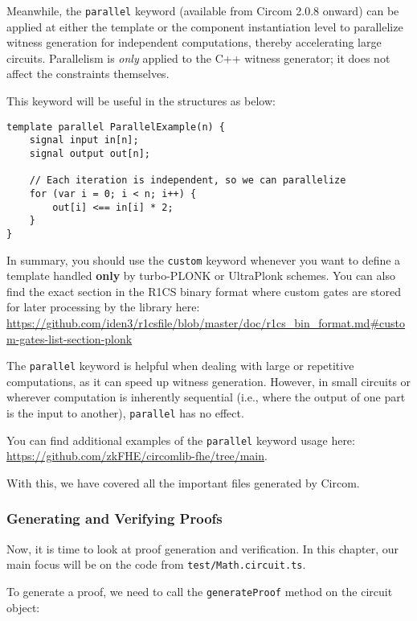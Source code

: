 \documentclass[../lecture-notes.tex]{subfiles}
\begin{document}
    Meanwhile, the \texttt{parallel} keyword (available from Circom 2.0.8 onward) can be applied at either the template or
    the component instantiation level to parallelize witness generation for independent computations, thereby accelerating large circuits.
    Parallelism is \emph{only} applied to the C++ witness generator; it does not affect the constraints themselves.

    This keyword will be useful in the structures as below:

    \begin{lstlisting}[language=Circom,basicstyle=\ttfamily\footnotesize]
template parallel ParallelExample(n) {
    signal input in[n];
    signal output out[n];

    // Each iteration is independent, so we can parallelize
    for (var i = 0; i < n; i++) {
        out[i] <== in[i] * 2;
    }
}
    \end{lstlisting}

    In summary, you should use the \texttt{custom} keyword whenever you want to define a template handled \textbf{only} by turbo-PLONK or UltraPlonk schemes.
    You can also find the exact section in the R1CS binary format where custom gates are stored for later processing by the library here:
    \url{https://github.com/iden3/r1csfile/blob/master/doc/r1cs_bin_format.md#custom-gates-list-section-plonk}

    The \texttt{parallel} keyword is helpful when dealing with large or repetitive computations, as it can speed up witness generation.
    However, in small circuits or wherever computation is inherently sequential (i.e., where the output of one part is the input to another), \texttt{parallel} has no effect.

    You can find additional examples of the \texttt{parallel} keyword usage here: \url{https://github.com/zkFHE/circomlib-fhe/tree/main}.

    With this, we have covered all the important files generated by Circom.

    \subsubsection{Generating and Verifying Proofs}

    Now, it is time to look at proof generation and verification.
    In this chapter, our main focus will be on the code from \texttt{test/Math.circuit.ts}.

    To generate a proof, we need to call the \texttt{generateProof} method on the circuit object:
\end{document}
